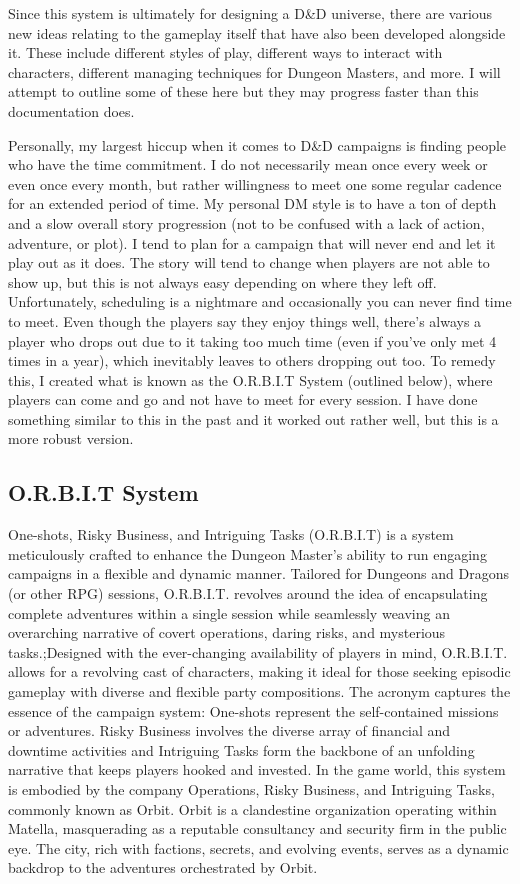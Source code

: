 Since this system is ultimately for designing a D\&D universe, there are various new ideas relating to the gameplay itself that have also been developed alongside it. These include different styles of play, different ways to interact with characters, different managing techniques for Dungeon Masters, and more. I will attempt to outline some of these here but they may progress faster than this documentation does.

Personally, my largest hiccup when it comes to D\&D campaigns is finding people who have the time commitment. I do not necessarily mean once every week or even once every month, but rather willingness to meet one some regular cadence for an extended period of time. My personal DM style is to have a ton of depth and a slow overall story progression (not to be confused with a lack of action, adventure, or plot). I tend to plan for a campaign that will never end and let it play out as it does. The story will tend to change when players are not able to show up, but this is not always easy depending on where they left off. Unfortunately, scheduling is a nightmare and occasionally you can never find time to meet. Even though the players say they enjoy things well, there's always a player who drops out due to it taking too much time (even if you've only met 4 times in a year), which inevitably leaves to others dropping out too. To remedy this, I created what is known as the O.R.B.I.T System (outlined below), where players can come and go and not have to meet for every session. I have done something similar to this in the past and it worked out rather well, but this is a more robust version.

\subsection{O.R.B.I.T System}

One-shots, Risky Business, and Intriguing Tasks (O.R.B.I.T) is a system meticulously crafted to enhance the Dungeon Master's ability to run engaging campaigns in a flexible and dynamic manner. Tailored for Dungeons and Dragons (or other RPG) sessions, O.R.B.I.T. revolves around the idea of encapsulating complete adventures within a single session while seamlessly weaving an overarching narrative of covert operations, daring risks, and mysterious tasks.;Designed with the ever-changing availability of players in mind, O.R.B.I.T. allows for a revolving cast of characters, making it ideal for those seeking episodic gameplay with diverse and flexible party compositions. The acronym captures the essence of the campaign system: One-shots represent the self-contained missions or adventures. Risky Business involves the diverse array of financial and downtime activities and Intriguing Tasks form the backbone of an unfolding narrative that keeps players hooked and invested. In the game world, this system is embodied by the company Operations, Risky Business, and Intriguing Tasks, commonly known as Orbit. Orbit is a clandestine organization operating within Matella, masquerading as a reputable consultancy and security firm in the public eye. The city, rich with factions, secrets, and evolving events, serves as a dynamic backdrop to the adventures orchestrated by Orbit.

